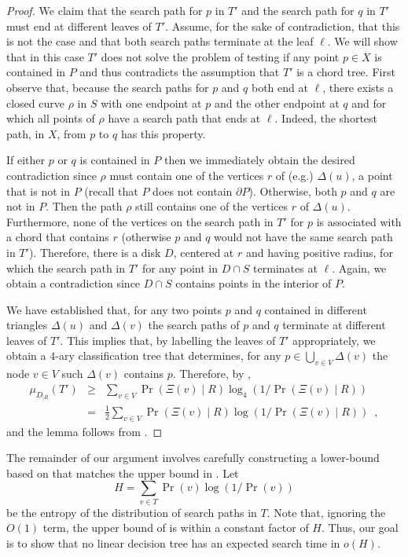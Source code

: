 \documentclass[charterfonts,lotsofwhite]{patmorin}
\newcommand{\boundary}{\partial}
\begin{document}
\begin{proof}
We claim that the search path for $p$ in $T'$ and the search path for
$q$ in $T'$ must end at different leaves of $T'$.  Assume, for the
sake of contradiction, that this is not the case and that both search
paths terminate at the leaf $\ell$. We will show that in this case
$T'$ does not solve the problem of testing if any point $p\in X$ is
contained in $P$ and thus contradicts the assumption that $T'$ is a
chord tree.  First observe that, because the search paths for $p$ and
$q$ both end at $\ell$, there exists a closed curve $\rho$ in $S$ with
one endpoint at $p$ and the other endpoint at $q$ and for which all
points of $\rho$ have a search path that ends at $\ell$.  Indeed, the
shortest path, in $X$, from $p$ to $q$ has this property.

If either $p$ or $q$ is contained in $P$ then we immediately obtain
the desired contradiction since $\rho$ must contain one of the
vertices $r$ of (e.g.) $\Delta(u)$, a point that is not in $P$ (recall
that $P$ does not contain $\boundary P$).  Otherwise, both $p$ and $q$
are not in $P$.  Then the path $\rho$ still contains one of the
vertices $r$ of $\Delta(u)$.  Furthermore, none of the vertices on the
search path in $T'$ for $p$ is associated with a chord that contains
$r$ (otherwise $p$ and $q$ would not have the same search path in
$T'$).  Therefore, there is a disk $D$, centered at $r$ and having
positive radius, for which the search path in $T'$ for any point in
$D\cap S$ terminates at $\ell$.  Again, we obtain a contradiction
since $D\cap S$ contains points in the interior of $P$.

We have established that, for any two points $p$ and $q$
contained in different triangles $\Delta(u)$ and $\Delta(v)$ the
search paths of $p$ and $q$ terminate at different leaves of $T'$.
This implies that, by labelling the leaves of $T'$ appropriately, we
obtain a $4$-ary classification tree that determines, for any
$p\in \bigcup_{v\in V} \Delta(v)$ the node $v\in V$ such
$\Delta(v)$ contains $p$.  Therefore, by ,
\begin{eqnarray*}
  \mu_{D_{|R}} (T') 
   &\ge& \sum_{v\in V}\Pr(\Xi(v)\mid R)\log_4(1/\Pr(\Xi(v)\mid R)) \\
   &=& \frac{1}{2}\sum_{v\in V}\Pr(\Xi(v)\mid R)\log(1/\Pr(\Xi(v)\mid R)) \enspace ,
\end{eqnarray*}
and the lemma follows from .
\end{proof}

The remainder of our argument involves carefully constructing a
lower-bound based on  that matches the upper bound
in .  Let 
\[
   H = \sum_{v\in T} \Pr(v)\log (1/\Pr(v))
\] 
be the entropy of the distribution of search paths in $T$.  Note that,
ignoring the $O(1)$ term,
the upper bound of  is within a constant factor of
$H$. Thus, our goal is to show that no linear decision tree has an
expected search time in $o(H)$.
\end{document}
